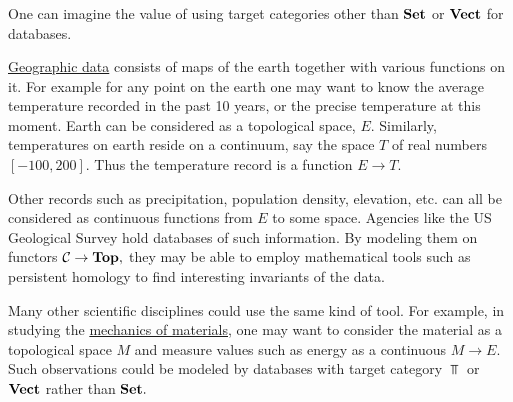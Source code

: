 \documentclass[CT4S-EN-RU]{subfiles}
\begin{document}

\subsubsection{}\label{sec:other targets}

\begin{blockENG}
One can imagine the value of using target categories other than ${\mathbf{Set}}$ or ${\mathbf{Vect}}$ for databases. 
\end{blockENG}

\begin{blockRUS}
\end{blockRUS}

\begin{applicationENG}
\href{http://en.wikipedia.org/wiki/Geographic_data}{\text Geographic data} consists of maps of the earth together with various functions on it. For example for any point on the earth one may want to know the average temperature recorded in the past 10 years, or the precise temperature at this moment. Earth can be considered as a topological space, $E.$ Similarly, temperatures on earth reside on a continuum, say the space $T$ of real numbers $[-100,200].$ Thus the temperature record is a function $E\to T.$ 

Other records such as precipitation, population density, elevation, etc. can all be considered as continuous functions from $E$ to some space. Agencies like the US Geological Survey hold databases of such information. By modeling them on functors $\mathcal{C}\rightarrow{\mathbf{Top}},$ they may be able to employ mathematical tools such as persistent homology \cite{WeS} to find interesting invariants of the data.
\end{applicationENG}

\begin{applicationRUS}
\end{applicationRUS}

\begin{applicationENG}
Many other scientific disciplines could use the same kind of tool. For example, in studying the \href{http://en.wikipedia.org/wiki/Strength_of_materials}{\text mechanics of materials}, one may want to consider the material as a topological space $M$ and measure values such as energy as a continuous $M\to E.$ Such observations could be modeled by databases with target category $\Top$ or ${\mathbf{Vect}}$ rather than ${\mathbf{Set}}.$
\end{applicationENG}
\end{document}
